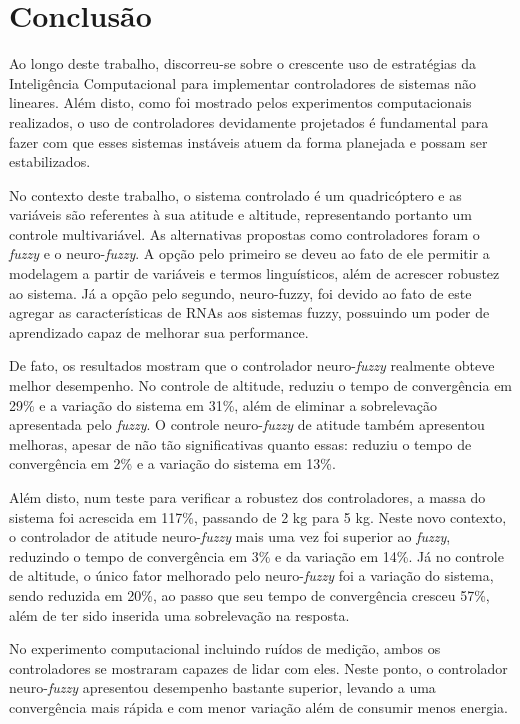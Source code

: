 %
%

\chapter{Conclusão}
\label{chap:conclusao}

Ao longo deste trabalho, discorreu-se sobre o crescente uso de estratégias da Inteligência Computacional para implementar controladores de sistemas não lineares. Além disto, como foi mostrado pelos experimentos computacionais realizados, o uso de controladores devidamente projetados é fundamental para fazer com que esses sistemas instáveis atuem da forma planejada e possam ser estabilizados.

No contexto deste trabalho, o sistema controlado é um quadricóptero e as variáveis são referentes à sua atitude e altitude, representando portanto um controle multivariável. As alternativas propostas como controladores foram o \textit{fuzzy} e o neuro-\textit{fuzzy}. A opção pelo primeiro se deveu ao fato de ele permitir a modelagem a partir de variáveis e termos linguísticos, além de acrescer robustez ao sistema. Já a opção pelo segundo, neuro-fuzzy, foi devido ao fato de este agregar as características de RNAs aos sistemas fuzzy, possuindo um poder de aprendizado capaz de melhorar sua performance.

De fato, os resultados mostram que o controlador neuro-\textit{fuzzy} realmente obteve melhor desempenho. No controle de altitude, reduziu o tempo de convergência em 29\% e a variação do sistema em 31\%, além de eliminar a sobrelevação apresentada pelo \textit{fuzzy}. O controle neuro-\textit{fuzzy} de atitude também apresentou melhoras, apesar de não tão significativas quanto essas: reduziu o tempo de convergência em 2\% e a variação do sistema em 13\%.

Além disto, num teste para verificar a robustez dos controladores, a massa do sistema foi acrescida em 117\%, passando de 2 kg para 5 kg. Neste novo contexto, o controlador de atitude neuro-\textit{fuzzy} mais uma vez foi superior ao \textit{fuzzy}, reduzindo o tempo de convergência em 3\% e da variação em 14\%. Já no controle de altitude, o único fator melhorado pelo neuro-\textit{fuzzy} foi a variação do sistema, sendo reduzida em 20\%, ao passo que seu tempo de convergência cresceu 57\%, além de ter sido inserida uma sobrelevação na resposta.

No experimento computacional incluindo ruídos de medição, ambos os controladores se mostraram capazes de lidar com eles. Neste ponto, o controlador neuro-\textit{fuzzy} apresentou desempenho bastante superior, levando a uma convergência mais rápida e com menor variação além de consumir menos energia.

